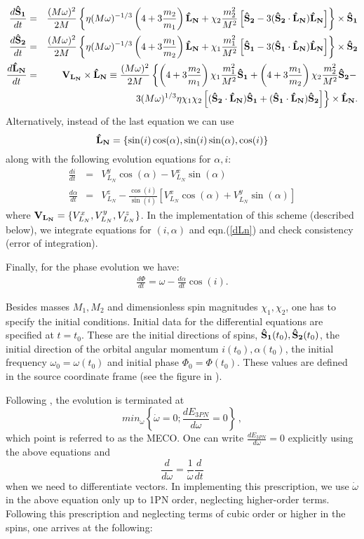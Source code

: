 \documentclass[11pt]{report}
\def\be{\begin{equation}}
\def\ee{\end{equation}}
\def\bea{\begin{eqnarray}}
\def\ena{\end{eqnarray}}
\def\bSo{{\bf \hat{S}_1}}
\def\bSt{{\bf \hat{S}_2}}
\def\bL{{\bf \hat{L}_{N}}}
\begin{document}
\bea
\frac{d\bSo}{dt} &=& \frac{(M\omega)^2}{2M}\left\{ \eta (M\omega)^{-1/3}
\left(4+3\frac{m_2}{m_1}\right)\bL + \chi_2\frac{m_2^2}{M^2}\left[
\bSt - 3(\bSt\cdot\bL)\bL\right]\right\}\times \bSo \\
\frac{d\bSt}{dt} &=& \frac{(M\omega)^2}{2M}\left\{ \eta (M\omega)^{-1/3}
\left(4+3\frac{m_1}{m_2}\right)\bL + \chi_1\frac{m_1^2}{M^2}\left[
\bSo - 3(\bSo \cdot \bL)\bL\right]\right\}\times \bSt\\
\frac{d\bL}{dt} &=& {\bf V_{L_N} }\times\bL \equiv \frac{(M\omega)^2}{2M}
\left\{ \left(4 + 3\frac{m_2}{m_1}\right)\chi_1\frac{m_1^2}{M^2}\bSo +
\left(4 + 3\frac{m_1}{m_2}\right)\chi_2\frac{m_2^2}{M^2}\bSt- \right.
\nonumber\\
&& \left. 3(M\omega)^{1/3}\eta\chi_1\chi_2\left[ (\bSt\cdot\bL)\bSo +
(\bSo \cdot \bL)\bSt \right] \right\}\times\bL .\label{dLn}
\ena
Alternatively, instead of the last equation we can use 
\be
\bL = \{ \sin(i)\cos(\alpha), \sin(i)\sin(\alpha), \cos(i) \}
\ee
along with the following evolution equations for $\alpha, i$:
\bea
\frac{di}{dt} &=& V_{L_N}^{y} \cos(\alpha) - V_{L_N}^{x}\sin(\alpha)\\
\frac{d\alpha}{dt} &=& V_{L_N}^z - \frac{\cos(i)}{\sin(i)}\left[ 
V_{L_N}^{x} \cos(\alpha) + V_{L_N}^{y}\sin(\alpha) \right]
\ena
where ${\bf V_{L_N} } = 
\{ V_{L_N}^{x}, V_{L_N}^{y}, V_{L_N}^{z}\}$.
In the implementation of this scheme (described below), we integrate  
equations for $(i, \alpha)$ and eqn.(\ref{dLn}) and check consistency
(error of integration).

Finally, for the phase evolution we have:
\bea
\frac{d\Phi}{dt} = \omega - \frac{d\alpha}{dt}\cos(i).
\ena 

Besides masses $M_1, M_2$ and dimensionless spin magnitudes $\chi_1, \chi_2$,
one has to specify the initial conditions. Initial data for the differential 
equations are specified at $t=t_0$.  These are the initial directions of spins,
$\bSo(t_0), \bSt(t_0)$, the initial direction of the orbital angular momentum
$i(t_0), \alpha(t_0)$, the initial frequency $\omega_0 = \omega(t_0)$ and
initial phase $\Phi_0 = \Phi(t_0)$. 
These values are defined in the source coordinate frame (see the figure in \cite{BCV2}).

Following \cite{BCV2}, the evolution is terminated at 
\be
min_{\omega}\left\{ \dot{\omega}= 0; \frac{dE_{3PN}}{d\omega} = 0\right\} \, ,
\ee
which point is referred to as the MECO.
One can write $\frac{dE_{3PN}}{d\omega} = 0$ explicitly using the above equations
and 
\be
\frac{d}{d\omega} = \frac{1}{\dot{\omega}} \frac{d}{dt}
\ee
when we need to differentiate vectors. In implementing this prescription, we use $\dot{\omega}$ in the above
equation only up to 1PN order, neglecting higher-order terms. Following this prescription 
and neglecting terms of cubic order or higher in the spins, one arrives at the following:
\end{document}

